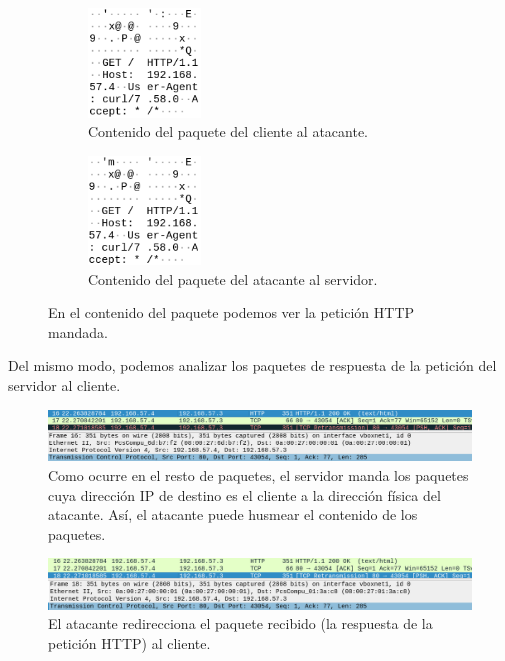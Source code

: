 \documentclass[11pt]{article}
\begin{document}
\begin{figure}[H]
	\centering
	\begin{subfigure}{0.45\textwidth}
		\centering
		\includegraphics[width=30mm]{images/atack1/client-atacker}
		\captionsetup{width=0.5\linewidth}
		\caption{Contenido del paquete del cliente al atacante.}
	\end{subfigure}
	\hspace{-20mm}
	\begin{subfigure}{0.45\textwidth}
		\centering
		\includegraphics[width=30mm]{images/atack1/atacker-server}
		\captionsetup{width=0.5\linewidth}
		\caption{Contenido del paquete del atacante al servidor.}
	\end{subfigure}
	\caption{En el contenido del paquete podemos ver la petición HTTP mandada.}
\end{figure}

Del mismo modo, podemos analizar los paquetes de respuesta de la petición del servidor al cliente.

\begin{figure}[H]
	\centering
	\includegraphics[width=160mm]{images/atack1/response-server-atacker}
	\caption{Como ocurre en el resto de paquetes, el servidor manda los paquetes cuya dirección IP de destino es el cliente a la dirección física del atacante. Así, el atacante puede husmear el contenido de los paquetes.}
	\label{fig:response-server-atacker}
\end{figure}

\begin{figure}[H]
	\centering
	\includegraphics[width=160mm]{images/atack1/response-atacker-client}
	\caption{El atacante redirecciona el paquete recibido (la respuesta de la petición HTTP) al cliente.}
	\label{fig:response-atacker-client}
\end{figure}
\end{document}
